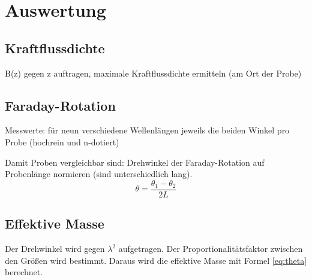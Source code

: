 \section{Auswertung}
\label{sec:Auswertung}

\subsection{Kraftflussdichte}
B(z) gegen z auftragen, maximale Kraftflussdichte ermitteln (am Ort der Probe)

\subsection{Faraday-Rotation}
Messwerte: für neun verschiedene Wellenlängen jeweils die beiden Winkel pro Probe (hochrein und n-dotiert)

Damit Proben vergleichbar sind: Drehwinkel der Faraday-Rotation auf Probenlänge normieren (sind unterschiedlich lang).
\begin{equation}
    \theta = \frac{\theta_1 - \theta_2}{2L}
\end{equation}

\subsection{Effektive Masse}
Der Drehwinkel wird gegen $\lambda^2$ aufgetragen. Der Proportionalitätsfaktor zwischen den Größen wird bestimmt. Daraus wird die effektive Masse mit Formel \ref{eq:theta} berechnet.